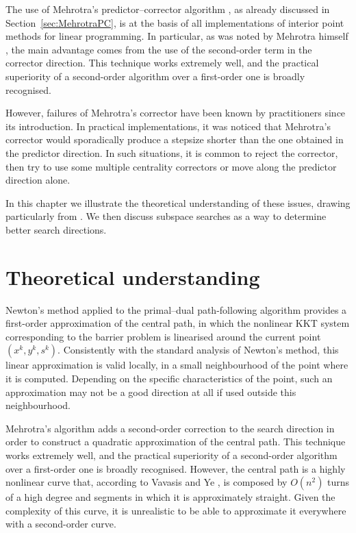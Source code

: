 
%
%
\label{ch:Correctors}

The use of Mehrotra's predictor--corrector algorithm \cite{Mehrotra92},
as already discussed in Section~\ref{sec:MehrotraPC}, is at the basis of all
implementations of interior point methods for linear programming.
In particular, as was noted by
Mehrotra himself \cite{Mehrotra92}, the main advantage comes from 
the use of the second-order term in the corrector direction.
This technique works extremely well, and the practical superiority of 
a second-order algorithm over a first-order one is broadly recognised.

However, failures of Mehrotra's corrector have been known by practitioners 
since its introduction. In practical implementations, it was noticed 
that Mehrotra's corrector would sporadically produce a stepsize 
shorter than the one obtained in the predictor direction. 
In such situations, it is common 
to reject the corrector, then try to use some multiple centrality 
correctors or move along the predictor direction alone.


In this chapter we illustrate the theoretical understanding of 
these issues, drawing particularly from \cite{Cartis04,Cartis05}.
We then discuss subspace searches as a way to determine better
search directions.



%
%
\section{Theoretical understanding}

Newton's method applied to the primal--dual path-following algorithm 
provides a first-order approximation of the central path, in which
the nonlinear KKT system corresponding to the barrier problem 
is linearised around the current point $(x^k,y^k,s^k)$. Consistently with 
the standard analysis of Newton's method, this linear approximation 
is valid locally, in a small neighbourhood of the point where 
it is computed. Depending on the specific characteristics of the point, 
such an approximation may not be a good direction at all 
if used outside this neighbourhood.


Mehrotra's algorithm adds a second-order correction to the search 
direction in order to construct a quadratic approximation 
of the central path. This technique works extremely well, 
and the practical superiority of a second-order algorithm over 
a first-order one is broadly recognised.
However, the central path is a highly nonlinear curve that, according 
to Vavasis and Ye \cite{VavasisYe}, is composed by $O(n^2)$ turns 
of a high degree and segments in which it is approximately straight. 
Given the complexity of this curve, it is unrealistic to be able 
to approximate it everywhere with a second-order curve.

